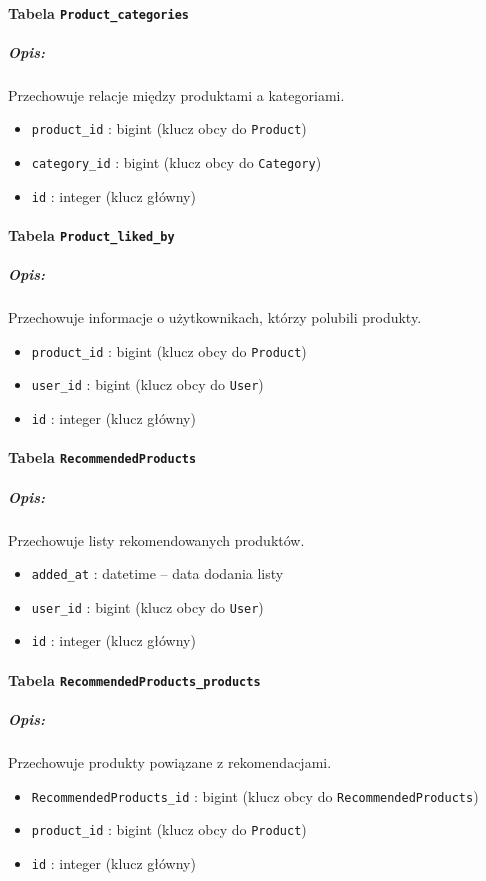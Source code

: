 \documentclass[12pt,a4paper,oneside]{article}
\theoremstyle{definition}
\numberwithin{equation}{section}
\begin{document}
\paragraph{Tabela \texttt{Product\string_categories}}
\subparagraph{Opis:} Przechowuje relacje między produktami a kategoriami.
\begin{itemize}
    \item \texttt{product\string_id} : bigint (klucz obcy do \texttt{Product})
    \item \texttt{category\string_id} : bigint (klucz obcy do \texttt{Category})
    \item \texttt{id} : integer (klucz główny)
\end{itemize}

\paragraph{Tabela \texttt{Product\string_liked\string_by}}
\subparagraph{Opis:} Przechowuje informacje o użytkownikach, którzy polubili produkty.
\begin{itemize}
    \item \texttt{product\string_id} : bigint (klucz obcy do \texttt{Product})
    \item \texttt{user\string_id} : bigint (klucz obcy do \texttt{User})
    \item \texttt{id} : integer (klucz główny)
\end{itemize}

\paragraph{Tabela \texttt{RecommendedProducts}}
\subparagraph{Opis:} Przechowuje listy rekomendowanych produktów.
\begin{itemize}
    \item \texttt{added\string_at} : datetime – data dodania listy
    \item \texttt{user\string_id} : bigint (klucz obcy do \texttt{User})
    \item \texttt{id} : integer (klucz główny)
\end{itemize}

\paragraph{Tabela \texttt{RecommendedProducts\string_products}}
\subparagraph{Opis:} Przechowuje produkty powi\k{a}zane z rekomendacjami.
\begin{itemize}
    \item \texttt{RecommendedProducts\string_id} : bigint (klucz obcy do \texttt{RecommendedProducts})
    \item \texttt{product\string_id} : bigint (klucz obcy do \texttt{Product})
    \item \texttt{id} : integer (klucz główny)
\end{itemize}
\end{document}
